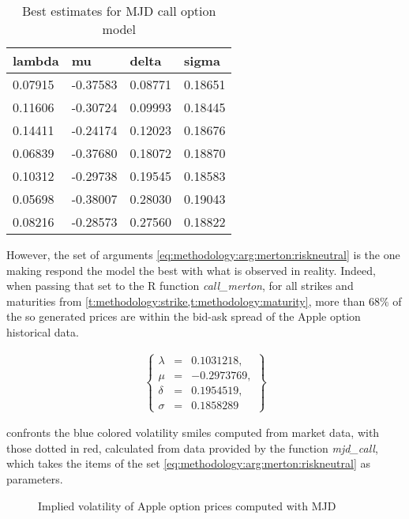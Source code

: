 \documentclass[12pt]{report}
\begin{document}
\begin{table}[ht]
\centering
\begin{tabular}{llll}
  \hline
lambda & mu & delta & sigma \\ 
  \hline
0.07915 & -0.37583 & 0.08771 & 0.18651 \\ 
  0.11606 & -0.30724 & 0.09993 & 0.18445 \\ 
  0.14411 & -0.24174 & 0.12023 & 0.18676 \\ 
  0.06839 & -0.37680 & 0.18072 & 0.18870 \\ 
  0.10312 & -0.29738 & 0.19545 & 0.18583 \\ 
  0.05698 & -0.38007 & 0.28030 & 0.19043 \\ 
  0.08216 & -0.28573 & 0.27560 & 0.18822 \\ 
   \hline
\end{tabular}
\caption{Best estimates for MJD call option model} 
\end{table}

However, the set of arguments \ref{eq:methodology:arg:merton:riskneutral} is the one making respond the model the best with what is observed in reality.
Indeed, when passing that set to the R function \textit{call\_merton}, for all strikes and maturities from \cref{t:methodology:strike,t:methodology:maturity}, more than $68\%$ of the so generated prices are within the bid-ask spread of the Apple option historical data.

\begin{align}
  \left \{
  \begin{array}{lcl}
    \lambda &= &0.1031218, \\
    \mu &= &-0.2973769, \\
    \delta &= &0.1954519, \\
    \sigma &= &0.1858289 
  \end{array}
  \right \}  
  \label{eq:methodology:arg:merton:riskneutral}
\end{align}

 confronts the blue colored volatility smiles computed from market data, with those dotted in red, calculated from data provided by the function \textit{mjd\_call}, which takes the items of the set \ref{eq:methodology:arg:merton:riskneutral} as parameters.

\begin{figure}[ht]
  \centering 
  
  \caption{Implied volatility of Apple option prices computed with MJD} 
  \label{p:methodology:impliedvol:aapl:merton}
\end{figure}
\end{document}
